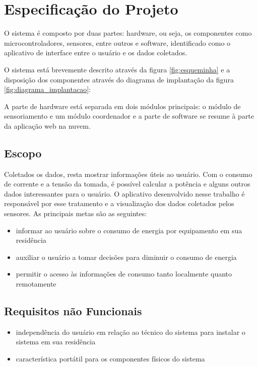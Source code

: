 \chapter{Especificação do Projeto}
\label{Cap:especificacao}

O sistema é composto por duas partes: hardware, ou seja, os componentes como microcontroladores, sensores, entre outros e software, identificado como o aplicativo de interface entre o usuário e os dados coletados.

O sistema está brevemente descrito através da figura \ref{fig:esqueminha} e a disposição dos componentes através do diagrama de implantação da figura \ref{fig:diagrama_implantacao}:

A parte de hardware está separada em dois módulos principais: o módulo de sensoriamento e um módulo coordenador e a parte de software se resume à parte da aplicação web na nuvem.



\section{Escopo}

Coletados os dados, resta mostrar informações úteis ao usuário. Com o consumo de corrente e a tensão da tomada, é possível calcular a potência e alguns outros dados interessantes para o usuário. O aplicativo desenvolvido nesse trabalho é responsável por esse tratamento e a visualização dos dados coletados pelos sensores. As principais metas são as seguintes:

\begin{itemize}
	\item{informar ao usuário sobre o consumo de energia por equipamento em sua residência}
	\item{auxiliar o usuário a tomar decisões para diminuir o consumo de energia}
  \item{permitir o acesso às informações de consumo tanto localmente quanto remotamente}
\end{itemize}
%

\section{Requisitos não Funcionais}

\begin{itemize}
	\item{independência do usuário em relação ao técnico do sistema para instalar o sistema em sua residência}
	\item{característica portátil para os componentes físicos do sistema}
\end{itemize}

